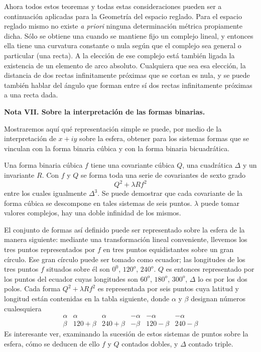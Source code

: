 \documentclass[a4paper, 12pt]{article}
\begin{document}
 Ahora todos estos teoremas y todas estas consideraciones pueden ser a continuación aplicadas para la Geometría del espacio reglado. Para el espacio reglado mismo no existe \textit{a priori }ninguna determinación métrica propiamente dicha. Sólo se obtiene una cuando se mantiene fijo un complejo lineal, y entonces ella tiene una curvatura constante o nula según que el complejo sea general o particular (una recta). A la elección de ese complejo está también ligada la existencia de un elemento de arco absoluto. Cualquiera que sea esa elección, la distancia de dos rectas infinitamente próximas que se cortan es nula, y se puede también hablar del ángulo que forman entre sí dos rectas infinitamente próximas a una recta dada. 

 

\noindent\textbf{Nota VII. Sobre la interpretación de las formas binarias.} 



 Mostraremos aquí qué representación simple se puede, por medio de la interpretación de $x + iy$ sobre la esfera, obtener para los sistemas formas que se vinculan con la forma binaria cúbica y con la forma binaria bicuadrática.

 Una forma binaria cúbica $f$ tiene una covariante cúbica $Q$, una cuadrática $\Delta $ y un invariante $R$. Con $f $ y $Q$ se forma toda una serie de covariantes de sexto grado $$ Q^2+\lambda Rf^2 $$ entre los cuales igualmente $\Delta^{3}$. Se puede demostrar que cada covariante de la forma cúbica se descompone en tales sistemas de seis puntos. $\lambda $ puede tomar valores complejos, hay una doble infinidad de los mismos.

 El conjunto de formas así definido puede ser representado sobre la esfera de la manera siguiente: mediante una transformación lineal conveniente, llevemos los tres puntos representados por $f$ en tres puntos equidistantes sobre un gran círculo. Ese gran círculo puede ser tomado como ecuador; las longitudes de los tres puntos $f $ situados sobre él son $0^0$, $120^o$, $240^o$. $Q$ es entonces representado por los puntos del ecuador cuyas longitudes son $60^o$, $180^{o}$, $300^{o}$, $\Delta$ lo es por los dos polos. Cada forma $Q^{2}+\lambda Rf^{2}$ es representada por seis puntos cuya latitud y longitud están contenidas en la tabla siguiente, donde $\alpha$ y $\beta$ designan números cualesquiera $$ \begin{array}{c|c|c|c|c|c|} \alpha &\alpha &\alpha &-\alpha &-\alpha &-\alpha \\ \beta& 120+\beta& 240+\beta&-\beta& 120-\beta& 240-\beta \end{array} $$ Es interesante ver, examinando la sucesión de estos sistemas de puntos sobre la esfera, cómo se deducen de ello $f$ y $Q$ contados dobles, y $\Delta$ contado triple.
\end{document}
